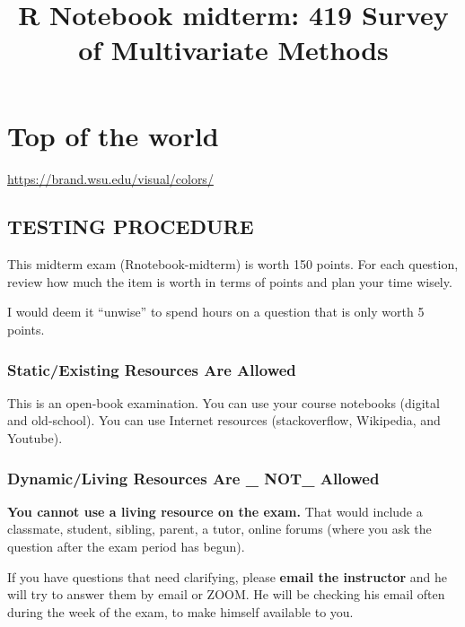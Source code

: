 \documentclass[
]{article}
\title{R Notebook midterm: 419 Survey of Multivariate Methods}
\author{}
\date{\vspace{-2.5em}}
\begin{document}
\maketitle

{
\setcounter{tocdepth}{6}
\tableofcontents
}
\hypertarget{top-of-the-world}{%
\section{Top of the world}\label{top-of-the-world}}

\url{https://brand.wsu.edu/visual/colors/}

\hypertarget{testing-procedure}{%
\subsection{TESTING PROCEDURE}\label{testing-procedure}}

This midterm exam (Rnotebook-midterm) is worth 150 points. For each
question, review how much the item is worth in terms of points and plan
your time wisely.

I would deem it ``unwise'' to spend hours on a question that is only
worth 5 points.

\hypertarget{staticexisting-resources-are-allowed}{%
\subsubsection{Static/Existing Resources Are
Allowed}\label{staticexisting-resources-are-allowed}}

This is an open-book examination. You can use your course notebooks
(digital and old-school). You can use Internet resources (stackoverflow,
Wikipedia, and Youtube).

\hypertarget{dynamicliving-resources-are-_-not_-allowed}{%
\subsubsection{\texorpdfstring{Dynamic/Living Resources Are \_
\textbf{NOT}\_
Allowed}{Dynamic/Living Resources Are \_ NOT\_ Allowed}}\label{dynamicliving-resources-are-_-not_-allowed}}

\textbf{You cannot use a living resource on the exam.} That would
include a classmate, student, sibling, parent, a tutor, online forums
(where you ask the question after the exam period has begun).

If you have questions that need clarifying, please \textbf{email the
instructor} and he will try to answer them by email or ZOOM. He will be
checking his email often during the week of the exam, to make himself
available to you.
\end{document}

